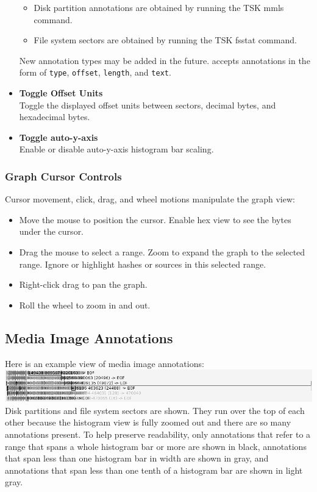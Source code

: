 \documentclass[11pt,fleqn]{article} %
\begin{document}
\begin{itemize}
  \begin{itemize}
  \item Disk partition annotations are obtained by running the TSK mmls command.
  \item File system sectors are obtained by running the TSK fsstat command.
  \end{itemize}
New annotation types may be added in the future. \sscope accepts annotations in the form of \verb+type+, \verb+offset+, \verb+length+, and \verb+text+.
\item \textbf{Toggle Offset Units}\\
Toggle the displayed offset units between sectors, decimal bytes, and hexadecimal bytes.
\item \textbf{Toggle auto-y-axis}\\
Enable or disable auto-y-axis histogram bar scaling.
\end{itemize}

\subsubsection{Graph Cursor Controls}
Cursor movement, click, drag, and wheel motions manipulate the graph view:
\begin{itemize}
\item Move the mouse to position the cursor. Enable hex view to see the bytes under the cursor.
\item Drag the mouse to select a range. Zoom to expand the graph to the selected range. Ignore or highlight hashes or sources in this selected range.
\item Right-click drag to pan the graph.
\item Roll the wheel to zoom in and out.
\end{itemize}

\subsection{Media Image Annotations}
Here is an example view of media image annotations:\\
\includegraphics[scale=.4]{screenshots/annotations}\\
Disk partitions and file system sectors are shown. They run over the top of each other because the histogram view is fully zoomed out and there are so many annotations present. To help preserve readability, only annotations that refer to a range that spans a whole histogram bar or more are shown in black, annotations that span less than one histogram bar in width are shown in gray, and annotations that span less than one tenth of a histogram bar are shown in light gray.
\end{document}
